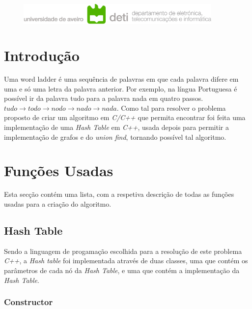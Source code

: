 \documentclass[a4paper,11pt]{article}
\title{}
\author{
    André Cardoso 50\%\\
    andremacardoso@ua.pt\\
    108269\\
    \and
    Tiago Figueiredo 50\%\\
    tiago.a.figueiredo@ua.pt\\
    107263\\
}
\date{09 de Janeiro de 2023}
\begin{document}
    \begin{figure}
        \centering
        \includegraphics[width=0.9\textwidth]{deti2}\label{fig:figure}
    \end{figure}
    \maketitle
    \tableofcontents
    \clearpage


    \section{Introdução}\label{sec:introducao}
Uma word ladder é uma sequência de palavras em que cada palavra difere em uma e só uma letra da palavra anterior.
Por exemplo, na língua Portuguesa é possível ir da palavra tudo para a palavra nada em quatro passos.
\emph{$tudo \rightarrow todo \rightarrow nodo \rightarrow nado \rightarrow nada$}.
Como tal para resolver o problema proposto de criar um algoritmo em \emph{C/C++} que permita encontrar foi feita uma implementação de uma \emph{Hash Table} em \emph{C++}, usada depois para permitir a implementação de grafos e do \emph{union find}, tornando possível tal algoritmo.

    \section{Funções Usadas}\label{sec:funcoes-usadas}
    Esta secção contém uma lista, com a respetiva descrição de todas as funções usadas para a criação do algoritmo.

    \subsection{Hash Table}\label{subsec:hash-table}
    Sendo a linguagem de progamação escolhida para a resolução de este problema \emph{C++}, a \emph{Hash table} foi implementada através de duas classes, uma que contém os parâmetros de cada nó da \emph{Hash Table}, e uma que contém a implementação da \emph{Hash Table}.

    \subsubsection{Constructor}
\end{document}
